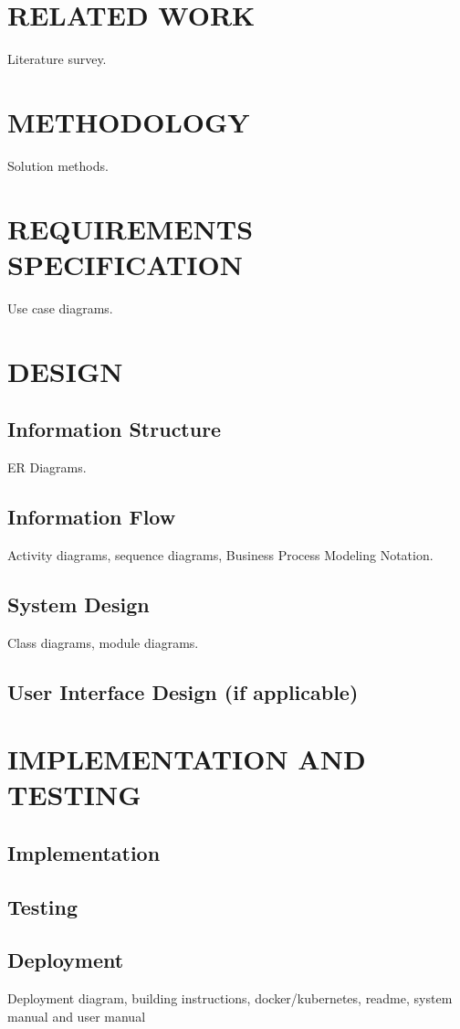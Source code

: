 \documentclass[a4paper,12pt]{report}
\begin{document}
\chapter{RELATED WORK}
Literature survey.

\chapter{METHODOLOGY}
Solution methods.

\chapter{REQUIREMENTS SPECIFICATION}
Use case diagrams.

\chapter{DESIGN}

\section{Information Structure}
ER Diagrams.

\section{Information Flow}
Activity diagrams, sequence diagrams, Business Process Modeling Notation.

\section{System Design}
Class diagrams, module diagrams.

\section{User Interface Design (if applicable)}

\chapter{IMPLEMENTATION AND TESTING}
\section{Implementation}
\section{Testing}
\section{Deployment}
Deployment diagram, building instructions, docker/kubernetes, readme, system manual and user manual
\end{document}
